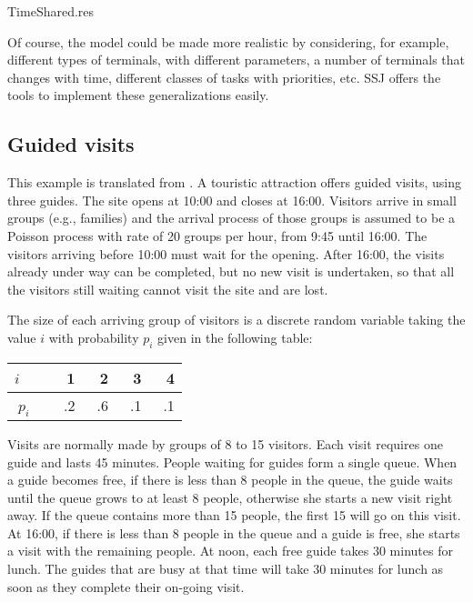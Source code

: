 %
{TimeShared.res}

Of course, the model could be made more realistic by considering,
for example, different types of terminals, with different parameters,
a number of terminals that changes with time,
different classes of tasks with priorities, etc.
SSJ offers the tools to implement these generalizations easily.


\subsection {Guided visits}
\label {sec:visits}

This example is translated from \cite{sLEC88a}.
A touristic attraction offers guided visits, using three guides.
The site opens at 10:00 and closes at 16:00.
Visitors arrive in small groups (e.g., families) and the arrival
process of
those groups is assumed to be a Poisson process
with rate of 20 groups per hour, from 9:45 until 16:00.
The visitors arriving before 10:00 must wait for the opening.
After 16:00, the visits already under way can be completed,
but no new visit is undertaken, so that all the visitors still
waiting cannot visit the site and are lost.

The size of each arriving group of visitors is a discrete random
variable taking the value $i$ with probability $p_i$ given in the
following table:
\begin{center}
\begin{tabular}{r|rrrr}         \hline
   $i$ \ \  & 1  & 2  & 3  & 4\\  \hline
   $p_i$ \  & \ .2 & \ .6 & \ .1 & \ .1\\ \hline
\end{tabular}
\end{center}

Visits are normally made by groups of 8 to 15 visitors.
Each visit requires one guide and lasts 45 minutes.
People waiting for guides form a single queue.
When a guide becomes free, if there is less than 8 people
in the queue, the guide waits until the queue grows to at
least 8 people, otherwise she starts a new visit right away.
If the queue contains more than 15 people, the first 15 will
go on this visit.
At 16:00, if there is less than 8 people in the queue
and a guide is free, she starts a visit with the remaining
people.
At noon, each free guide takes 30 minutes for lunch.
The guides that are busy at that time will take 30 minutes
for lunch as soon as they complete their on-going visit.

